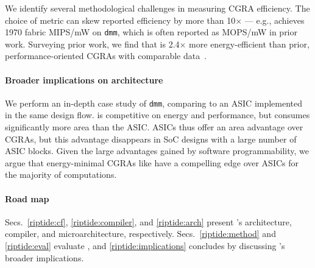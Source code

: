 We identify several methodological challenges in measuring CGRA efficiency.
%
The choice of metric can skew reported efficiency by more than 10$\times$ ---
e.g., \riptide achieves 1970 fabric MIPS/mW on {\tt dmm},
which is often reported as MOPS/mW in prior work.
%
Surveying prior work,
%
we find that \riptide is 2.4$\times$ more energy-efficient than prior, performance-oriented CGRAs
with comparable data~\cite{wang2019hycube,torng2021ultra}.


\paragraph{Broader implications on architecture}

We perform an in-depth case study of {\tt dmm},
comparing \riptide to an ASIC implemented in the same
design flow. \riptide is competitive on energy and performance, but
consumes significantly more area than the ASIC.
%
ASICs thus offer an area advantage over CGRAs, but this advantage
disappears in SoC designs with a large number of ASIC blocks. Given
the large advantages gained by software programmability, we argue that
energy-minimal CGRAs like \riptide have a compelling edge over ASICs for
the majority of computations.

\paragraph{Road map}
%
%
Secs.~\ref{riptide:cf}, \ref{riptide:compiler}, and \ref{riptide:arch} present
\riptide's architecture, compiler, and microarchitecture, respectively.
%
Secs.~\ref{riptide:method} and \ref{riptide:eval} evaluate \riptide, and
\autoref{riptide:implications} concludes by discussing \riptide's broader implications.

